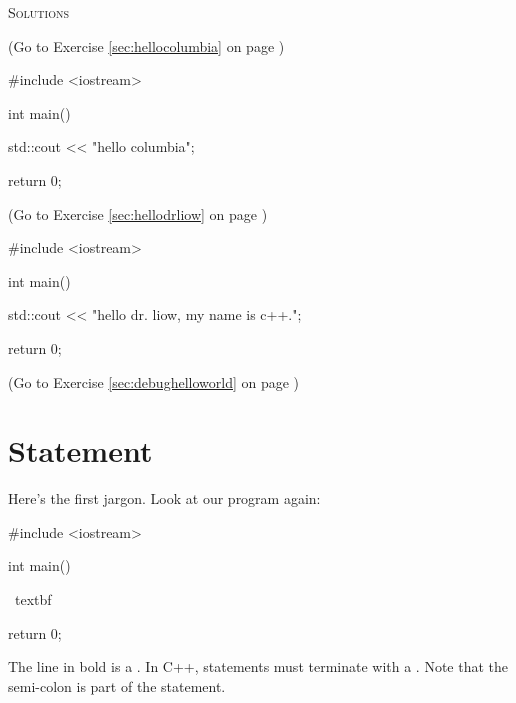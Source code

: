 \newpage\textsc{Solutions}

\begin{soln}\label{sec:hellocolumbia_soln}
(Go to Exercise \ref{sec:hellocolumbia} on page \pageref{sec:hellocolumbia})
\begin{console}
#include <iostream>

int main()
{
    std::cout << "hello columbia\n";

    return 0;
}
\end{console}
\end{soln}


\begin{soln}
\label{sec:hellodrliow_soln} 
(Go to Exercise \ref{sec:hellodrliow} 
on page \pageref{sec:hellodrliow})
\begin{console}
#include <iostream>

int main()
{
    std::cout << "hello dr. liow, my name is c++.\n";  
 
    return 0;   
}  
\end{console}   
\end{soln}  


\begin{soln} 
\label{sec:debughelloworld_soln} 
(Go to Exercise \ref{sec:debughelloworld} 
on page \pageref{sec:debughelloworld})
\end{soln}








\newpage\section{Statement}

Here's the first jargon. Look at our program again:
\begin{console}[commandchars=\~\%\@]
#include <iostream>

int main()
{
    ~textbf%

    return 0;
}
\end{console}

The line in bold is a 
. 
In C++, statements must terminate with a 
. 
Note that the semi-colon is part of the statement. 

